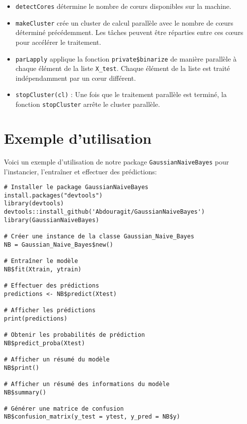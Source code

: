 \documentclass[]{article}
\begin{document}
\begin{itemize}
    \item \texttt{detectCores} détermine le nombre de cœurs disponibles sur la machine.
    \item \texttt{makeCluster} crée un cluster de calcul parallèle avec le nombre de cœurs déterminé précédemment. Les tâches peuvent être réparties entre ces cœurs pour accélérer le traitement.
    \item \texttt{parLapply} applique la fonction \texttt{private\$binarize} de manière parallèle à chaque élément de la liste \texttt{X\_test}. Chaque élément de la liste est traité indépendamment par un cœur différent.
    \item \texttt{stopCluster(cl)} : Une fois que le traitement parallèle est terminé, la fonction \texttt{stopCluster} arrête le cluster parallèle.
\end{itemize}

\vspace{0.3\baselineskip}

\begin{algorithm}


\end{algorithm}

\section{Exemple d'utilisation}

Voici un exemple d'utilisation de notre package \texttt{GaussianNaiveBayes} pour l'instancier, l'entraîner et effectuer des prédictions: 


\begin{verbatim}
# Installer le package GaussianNaiveBayes
install.packages("devtools")
library(devtools)
devtools::install_github('Abdouragit/GaussianNaiveBayes')
library(GaussianNaiveBayes)

# Créer une instance de la classe Gaussian_Naive_Bayes
NB = Gaussian_Naive_Bayes$new()

# Entraîner le modèle
NB$fit(Xtrain, ytrain)

# Effectuer des prédictions
predictions <- NB$predict(Xtest)

# Afficher les prédictions
print(predictions)

# Obtenir les probabilités de prédiction
NB$predict_proba(Xtest)

# Afficher un résumé du modèle
NB$print()

# Afficher un résumé des informations du modèle
NB$summary()

# Générer une matrice de confusion
NB$confusion_matrix(y_test = ytest, y_pred = NB$y)
\end{verbatim}
\end{document}
